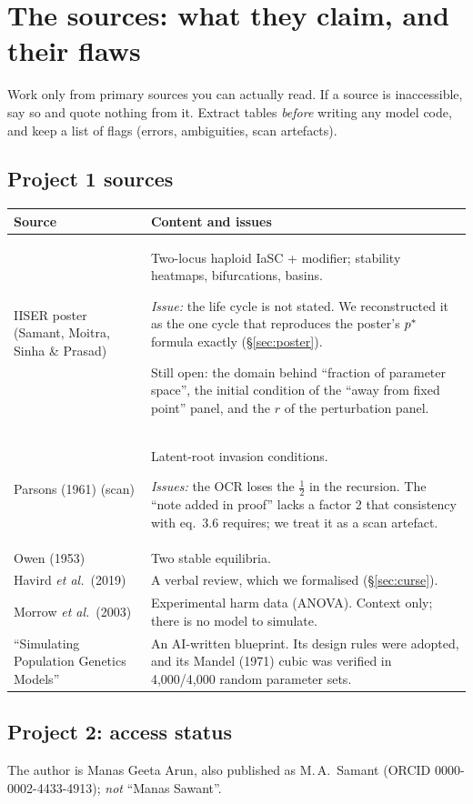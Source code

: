 \chapter{The sources: what they claim, and their flaws}\label{ch:sources}
\begin{keybox}[Rule]
Work only from primary sources you can actually read. If a source is inaccessible, say so and quote nothing from it. Extract tables \emph{before} writing any model code, and keep a list of flags (errors, ambiguities, scan artefacts).
\end{keybox}

\section{Project 1 sources}
\begin{tabularx}{\textwidth}{lX}\toprule
Source & Content and issues\\\midrule
IISER poster (Samant, Moitra, Sinha \& Prasad) & Two-locus haploid IaSC + modifier; stability heatmaps, bifurcations, basins.

\emph{Issue:} the life cycle is not stated. We reconstructed it as the one cycle that reproduces the poster's $p^{*}$ formula exactly (\S\ref{sec:poster}).

Still open: the domain behind ``fraction of parameter space'', the initial condition of the ``away from fixed point'' panel, and the $r$ of the perturbation panel.\\
Parsons (1961) (scan) & Latent-root invasion conditions.

\emph{Issues:} the OCR loses the $\tfrac12$ in the recursion. The ``note added in proof'' lacks a factor 2 that consistency with eq.\ 3.6 requires; we treat it as a scan artefact.\\
Owen (1953) & Two stable equilibria.\\
Havird \emph{et al.}\ (2019) & A verbal review, which we formalised (\S\ref{sec:curse}).\\
Morrow \emph{et al.}\ (2003) & Experimental harm data (ANOVA). Context only; there is no model to simulate.\\
``Simulating Population Genetics Models'' & An AI-written blueprint. Its design rules were adopted, and its Mandel (1971) cubic was verified in 4,000/4,000 random parameter sets.\\\bottomrule
\end{tabularx}

\section{Project 2: access status}
The author is Manas Geeta Arun, also published as M.\,A.\ Samant (ORCID 0000-0002-4433-4913); \emph{not} ``Manas Sawant''.

